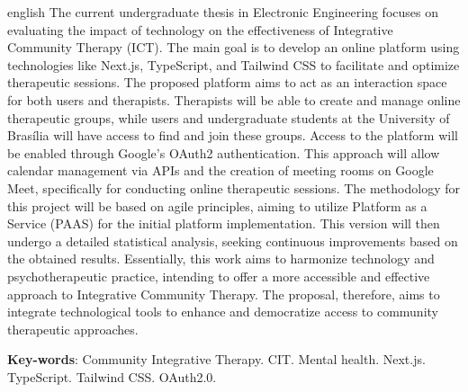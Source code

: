\begin{resumo}[Abstract]
 \begin{otherlanguage*}{english}
    The current undergraduate thesis in Electronic Engineering focuses on evaluating the impact of technology on the effectiveness of Integrative Community Therapy (ICT). The main goal is to develop an online platform using technologies like Next.js, TypeScript, and Tailwind CSS to facilitate and optimize therapeutic sessions. The proposed platform aims to act as an interaction space for both users and therapists. Therapists will be able to create and manage online therapeutic groups, while users and undergraduate students at the University of Brasília will have access to find and join these groups. Access to the platform will be enabled through Google's OAuth2 authentication. This approach will allow calendar management via APIs and the creation of meeting rooms on Google Meet, specifically for conducting online therapeutic sessions. The methodology for this project will be based on agile principles, aiming to utilize Platform as a Service (PAAS) for the initial platform implementation. This version will then undergo a detailed statistical analysis, seeking continuous improvements based on the obtained results. Essentially, this work aims to harmonize technology and psychotherapeutic practice, intending to offer a more accessible and effective approach to Integrative Community Therapy. The proposal, therefore, aims to integrate technological tools to enhance and democratize access to community therapeutic approaches.
   \vspace{\onelineskip}
 
   \noindent 
   \textbf{Key-words}: Community Integrative Therapy. CIT. Mental health. Next.js. TypeScript. Tailwind CSS. OAuth2.0.
 \end{otherlanguage*}
\end{resumo}
